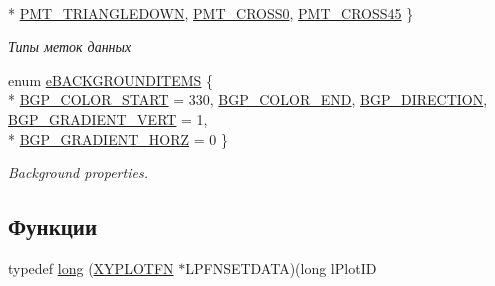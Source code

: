 \begin{DoxyCompactItemize}
\\*
\hyperlink{namespacexyplot_a883dfad9cc75a11fada8de767f1bf5aea17f39fa13200b18c59101c97a3cb96bd}{P\-M\-T\-\_\-\-T\-R\-I\-A\-N\-G\-L\-E\-D\-O\-W\-N}, 
\hyperlink{namespacexyplot_a883dfad9cc75a11fada8de767f1bf5aeae51b72c679aa1456731ae0faff6d6556}{P\-M\-T\-\_\-\-C\-R\-O\-S\-S0}, 
\hyperlink{namespacexyplot_a883dfad9cc75a11fada8de767f1bf5aea4dbc15a031ae37a6aa66704c4d701106}{P\-M\-T\-\_\-\-C\-R\-O\-S\-S45}
 \}
\begin{DoxyCompactList}\small\item\em Типы меток данных \end{DoxyCompactList}\item 
enum \hyperlink{namespacexyplot_a410c496bb2c7b2c65545816c23c44f74}{e\-B\-A\-C\-K\-G\-R\-O\-U\-N\-D\-I\-T\-E\-M\-S} \{ \\*
\hyperlink{namespacexyplot_a410c496bb2c7b2c65545816c23c44f74a151197be353d3d8e502367637a2cec08}{B\-G\-P\-\_\-\-C\-O\-L\-O\-R\-\_\-\-S\-T\-A\-R\-T} = 330, 
\hyperlink{namespacexyplot_a410c496bb2c7b2c65545816c23c44f74a021adf92c1730d6b988b4f7f07ca6b26}{B\-G\-P\-\_\-\-C\-O\-L\-O\-R\-\_\-\-E\-N\-D}, 
\hyperlink{namespacexyplot_a410c496bb2c7b2c65545816c23c44f74a8319780ecf883bbe86320797a81af53a}{B\-G\-P\-\_\-\-D\-I\-R\-E\-C\-T\-I\-O\-N}, 
\hyperlink{namespacexyplot_a410c496bb2c7b2c65545816c23c44f74a025e2deb997cb86a82387960670c03f9}{B\-G\-P\-\_\-\-G\-R\-A\-D\-I\-E\-N\-T\-\_\-\-V\-E\-R\-T} = 1, 
\\*
\hyperlink{namespacexyplot_a410c496bb2c7b2c65545816c23c44f74a77995bf2820085cc100567e705fd31b8}{B\-G\-P\-\_\-\-G\-R\-A\-D\-I\-E\-N\-T\-\_\-\-H\-O\-R\-Z} = 0
 \}
\begin{DoxyCompactList}\small\item\em Background properties. \end{DoxyCompactList}\end{DoxyCompactItemize}
\subsection*{Функции}
\begin{DoxyCompactItemize}
\item 
typedef \hyperlink{namespacexyplot_a27bc71b0bdfac09495e7e531d8a918c5}{long} (\hyperlink{_x_y_plot_wrapper_8h_aba6cc8b3b62f2540637745c385e17016}{X\-Y\-P\-L\-O\-T\-F\-N} $\ast$L\-P\-F\-N\-S\-E\-T\-D\-A\-T\-A)(long l\-Plot\-I\-D
\end{DoxyCompactItemize}


